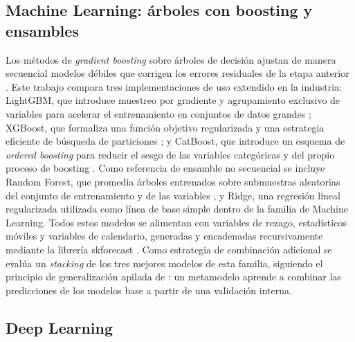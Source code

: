 \subsection{Machine Learning: árboles con boosting y ensambles}

Los métodos de \emph{gradient boosting} sobre árboles de decisión ajustan de manera secuencial modelos
débiles que corrigen los errores residuales de la etapa anterior \parencite{friedman2001}. Este trabajo
compara tres implementaciones de uso extendido en la industria: LightGBM, que introduce muestreo por
gradiente y agrupamiento exclusivo de variables para acelerar el entrenamiento en conjuntos de datos
grandes \parencite{ke2017lightgbm}; XGBoost, que formaliza una función objetivo regularizada y una
estrategia eficiente de búsqueda de particiones \parencite{chen2016xgboost}; y CatBoost, que introduce un
esquema de \emph{ordered boosting} para reducir el sesgo de las variables categóricas y del propio proceso
de boosting \parencite{prokhorenkova2018catboost}. Como referencia de ensamble no secuencial se incluye
Random Forest, que promedia árboles entrenados sobre submuestras aleatorias del conjunto de entrenamiento
y de las variables \parencite{breiman2001randomforest}, y Ridge, una regresión lineal regularizada
utilizada como línea de base simple dentro de la familia de Machine Learning. Todos estos modelos se
alimentan con variables de rezago, estadísticos móviles y variables de calendario, generadas y encadenadas
recursivamente mediante la librería skforecast \parencite{amatrodrigo2024skforecast}. Como estrategia de
combinación adicional se evalúa un \emph{stacking} de los tres mejores modelos de esta familia, siguiendo
el principio de generalización apilada de \textcite{wolpert1992stacking}: un metamodelo aprende a
combinar las predicciones de los modelos base a partir de una validación interna.

\subsection{Deep Learning}

